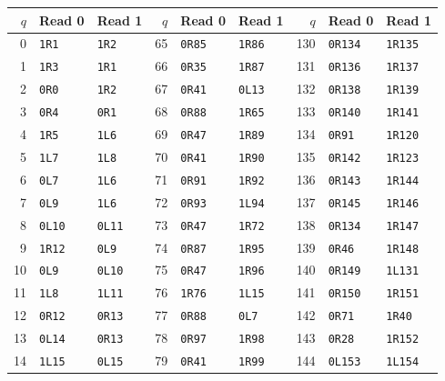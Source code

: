 {\scriptsize\renewcommand{\arraystretch}{0.88}
\begin{longtable}{@{}rll@{\hspace{1.8em}}rll@{\hspace{1.8em}}rll@{}}
\toprule $q$ & Read 0 & Read 1 & $q$ & Read 0 & Read 1 & $q$ & Read 0 & Read 1\\\midrule\endhead
0 & \texttt{1R1} & \texttt{1R2} & 65 & \texttt{0R85} & \texttt{1R86} & 130 & \texttt{0R134} & \texttt{1R135}\\
1 & \texttt{1R3} & \texttt{1R1} & 66 & \texttt{0R35} & \texttt{1R87} & 131 & \texttt{0R136} & \texttt{1R137}\\
2 & \texttt{0R0} & \texttt{1R2} & 67 & \texttt{0R41} & \texttt{0L13} & 132 & \texttt{0R138} & \texttt{1R139}\\
3 & \texttt{0R4} & \texttt{0R1} & 68 & \texttt{0R88} & \texttt{1R65} & 133 & \texttt{0R140} & \texttt{1R141}\\
4 & \texttt{1R5} & \texttt{1L6} & 69 & \texttt{0R47} & \texttt{1R89} & 134 & \texttt{0R91} & \texttt{1R120}\\
5 & \texttt{1L7} & \texttt{1L8} & 70 & \texttt{0R41} & \texttt{1R90} & 135 & \texttt{0R142} & \texttt{1R123}\\
6 & \texttt{0L7} & \texttt{1L6} & 71 & \texttt{0R91} & \texttt{1R92} & 136 & \texttt{0R143} & \texttt{1R144}\\
7 & \texttt{0L9} & \texttt{1L6} & 72 & \texttt{0R93} & \texttt{1L94} & 137 & \texttt{0R145} & \texttt{1R146}\\
8 & \texttt{0L10} & \texttt{0L11} & 73 & \texttt{0R47} & \texttt{1R72} & 138 & \texttt{0R134} & \texttt{1R147}\\
9 & \texttt{1R12} & \texttt{0L9} & 74 & \texttt{0R87} & \texttt{1R95} & 139 & \texttt{0R46} & \texttt{1R148}\\
10 & \texttt{0L9} & \texttt{0L10} & 75 & \texttt{0R47} & \texttt{1R96} & 140 & \texttt{0R149} & \texttt{1L131}\\
11 & \texttt{1L8} & \texttt{1L11} & 76 & \texttt{1R76} & \texttt{1L15} & 141 & \texttt{0R150} & \texttt{1R151}\\
12 & \texttt{0R12} & \texttt{0R13} & 77 & \texttt{0R88} & \texttt{0L7} & 142 & \texttt{0R71} & \texttt{1R40}\\
13 & \texttt{0L14} & \texttt{0R13} & 78 & \texttt{0R97} & \texttt{1R98} & 143 & \texttt{0R28} & \texttt{1R152}\\
14 & \texttt{1L15} & \texttt{0L15} & 79 & \texttt{0R41} & \texttt{1R99} & 144 & \texttt{0L153} & \texttt{1L154}\\

\end{longtable}}
